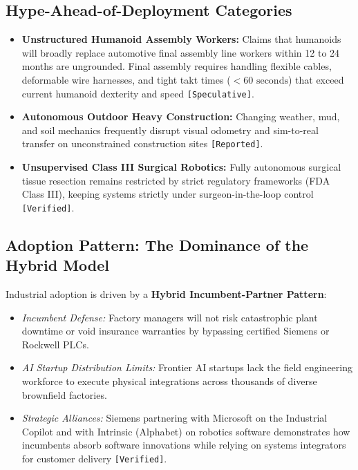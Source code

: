 \documentclass[11pt,a4paper]{article}
\begin{document}
\subsection{Hype-Ahead-of-Deployment Categories}
\begin{itemize}
    \item \textbf{Unstructured Humanoid Assembly Workers:} Claims that humanoids will broadly replace automotive final assembly line workers within 12 to 24 months are ungrounded. Final assembly requires handling flexible cables, deformable wire harnesses, and tight takt times ($<60\text{ seconds}$) that exceed current humanoid dexterity and speed \texttt{[Speculative]}.
    \item \textbf{Autonomous Outdoor Heavy Construction:} Changing weather, mud, and soil mechanics frequently disrupt visual odometry and sim-to-real transfer on unconstrained construction sites \texttt{[Reported]}.
    \item \textbf{Unsupervised Class III Surgical Robotics:} Fully autonomous surgical tissue resection remains restricted by strict regulatory frameworks (FDA Class III), keeping systems strictly under surgeon-in-the-loop control \texttt{[Verified]}.
\end{itemize}

\subsection{Adoption Pattern: The Dominance of the Hybrid Model}
Industrial adoption is driven by a \textbf{Hybrid Incumbent-Partner Pattern}:
\begin{itemize}
    \item \textit{Incumbent Defense:} Factory managers will not risk catastrophic plant downtime or void insurance warranties by bypassing certified Siemens or Rockwell PLCs.
    \item \textit{AI Startup Distribution Limits:} Frontier AI startups lack the field engineering workforce to execute physical integrations across thousands of diverse brownfield factories.
    \item \textit{Strategic Alliances:} Siemens partnering with Microsoft on the Industrial Copilot and with Intrinsic (Alphabet) on robotics software demonstrates how incumbents absorb software innovations while relying on systems integrators for customer delivery \texttt{[Verified]}.
\end{itemize}

\end{document}
